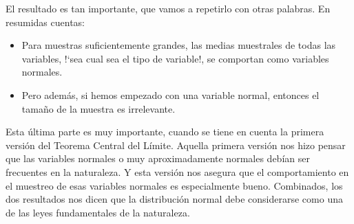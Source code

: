 El resultado es tan importante, que vamos a repetirlo con otras palabras. En
resumidas cuentas:
\begin{itemize}
  \item Para muestras suficientemente grandes, las medias muestrales de todas
      las variables, {!`}sea cual sea el tipo de variable!, se comportan como
      variables normales.
  \item Pero además, si hemos empezado con una variable normal, entonces el
      tamaño de la muestra es irrelevante.
\end{itemize}
Esta última parte es muy importante, cuando se tiene en cuenta la primera
versión del Teorema Central del Límite. Aquella primera versión nos hizo pensar
que las variables normales o muy aproximadamente normales debían ser frecuentes
en la naturaleza. Y esta versión nos asegura que el comportamiento en el
muestreo de esas variables normales es especialmente bueno. Combinados, los dos
resultados nos dicen que la distribución normal debe considerarse como una de
las leyes fundamentales de la naturaleza.

